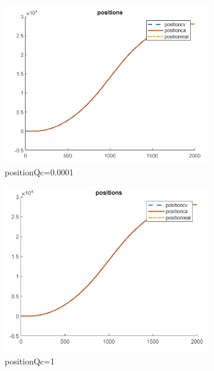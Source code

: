 \begin{figure}[H]
    \centering
    \begin{subfigure}[b]{0.3\textwidth}
        \includegraphics[width=\textwidth]{images/positionQc=0.0001.png}
        \caption{positionQc=0.0001}
        \label{fig:positionQc=0.0001}
    \end{subfigure}
    \begin{subfigure}[b]{0.3\textwidth}
        \includegraphics[width=\textwidth]{images/positionQc=1.png}
        \caption{positionQc=1}
        \label{fig:positionQc=1}
    \end{subfigure}
    \begin{subfigure}[b]{0.3\textwidth}

\end{subfigure}
\end{figure}
